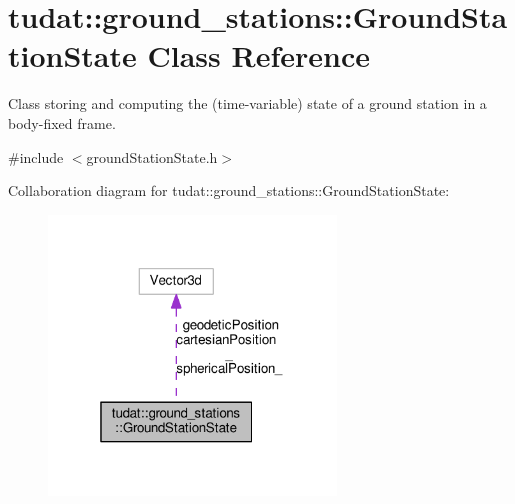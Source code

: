 \hypertarget{classtudat_1_1ground__stations_1_1GroundStationState}{}\section{tudat\+:\+:ground\+\_\+stations\+:\+:Ground\+Station\+State Class Reference}
\label{classtudat_1_1ground__stations_1_1GroundStationState}


Class storing and computing the (time-\/variable) state of a ground station in a body-\/fixed frame.  




{\ttfamily \#include $<$ground\+Station\+State.\+h$>$}



Collaboration diagram for tudat\+:\+:ground\+\_\+stations\+:\+:Ground\+Station\+State\+:
\nopagebreak
\begin{figure}[H]
\begin{center}
\leavevmode
\includegraphics[width=217pt]{classtudat_1_1ground__stations_1_1GroundStationState__coll__graph}
\end{center}
\end{figure}
